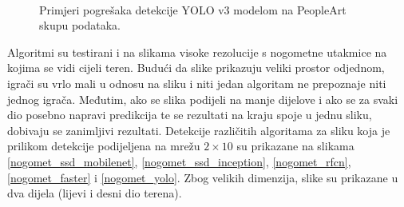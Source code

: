 \begin{figure}[H]
\begin{center}
 \
 \
\caption{Primjeri pogrešaka detekcije YOLO v3 modelom na PeopleArt skupu podataka.}
\end{center}
\end{figure}

Algoritmi su testirani i na slikama visoke rezolucije s nogometne utakmice na kojima se vidi cijeli teren. Budući da slike prikazuju veliki prostor odjednom, igrači su vrlo mali u odnosu na sliku i niti jedan algoritam ne prepoznaje niti jednog igrača. Međutim, ako se slika podijeli na manje dijelove i ako se za svaki dio posebno napravi predikcija te se rezultati na kraju spoje u jednu sliku, dobivaju se zanimljivi rezultati. Detekcije različitih algoritama za sliku koja je prilikom detekcije podijeljena na mrežu $2 \times 10$ su prikazane na slikama \ref{nogomet_ssd_mobilenet}, \ref{nogomet_ssd_inception}, \ref{nogomet_rfcn}, \ref{nogomet_faster} i \ref{nogomet_yolo}. Zbog velikih dimenzija, slike su prikazane u dva dijela (lijevi i desni dio terena).

